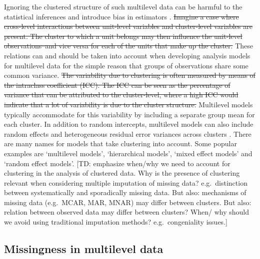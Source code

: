 \documentclass[
]{jss}
\begin{document}
Ignoring the clustered structure of such multilevel data can be harmful
to the statistical inferences and introduce bias in estimators
\citep{hox17}. \sout{Imagine a case where cross-level interactions
between unit-level variables and cluster-level variables are present.
The cluster to which a unit belongs may then influence the unit-level
observations--and vice versa for each of the units that make up the
cluster.} These relations can and should be taken into account when
developing analysis models for multilevel data for the simple reason
that groups of observations share some common variance. \sout{The
variability due to clustering is often measured by means of the
intraclass coefficient (ICC). The ICC can be seen as the percentage of
variance that can be attributed to the cluster-level, where a high ICC
would indicate that a lot of variability is due to the cluster
structure.} Multilevel models typically accommodate for this variability
by including a separate group mean for each cluster. In addition to
random intercepts, multilevel models can also include random effects and
heterogeneous residual error variances across clusters \citep[see
e.g.][\citet{hox17} and \citet{jong21}]{gelm06}. There are many names
for models that take clustering into account. Some popular examples are
`multilevel models', `hierarchical models', `mixed effect models' and
`random effect models'. {[}TD: emphasize when/why we need to account for
clustering in the analysis of clustered data. Why is the presence of
clustering relevant when considering multiple imputation of missing
data? e.g.~distinction between systematically and sporadically missing
data. But also: mechanisms of missing data (e.g.~MCAR, MAR, MNAR) may
differ between clusters. But also: relation between observed data may
differ between clusters? When/ why should we avoid using traditional
imputation methods? e.g.~congeniality issues.{]}

\hypertarget{missingness-in-multilevel-data}{%
\subsection{Missingness in multilevel
data}\label{missingness-in-multilevel-data}}
\end{document}

